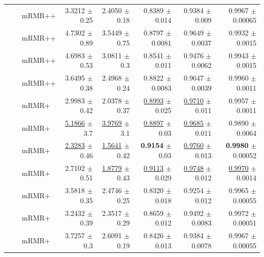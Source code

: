 \begin{longtable}{llp{}rrrrr}
 &  & mRMR++ & 3.3212 {\scriptsize $\pm$ 0.25} & 2.4050 {\scriptsize $\pm$ 0.18} & 0.8389 {\scriptsize $\pm$ 0.014} & 0.9384 {\scriptsize $\pm$ 0.009} & 0.9967 {\scriptsize $\pm$ 0.00065} \\
 &  & mRMR++ & 4.7302 {\scriptsize $\pm$ 0.89} & 3.5449 {\scriptsize $\pm$ 0.75} & 0.8797 {\scriptsize $\pm$ 0.0081} & 0.9649 {\scriptsize $\pm$ 0.0037} & 0.9932 {\scriptsize $\pm$ 0.0015} \\
 &  & mRMR++ & 4.6983 {\scriptsize $\pm$ 0.53} & 3.0811 {\scriptsize $\pm$ 0.3} & 0.8541 {\scriptsize $\pm$ 0.011} & 0.9476 {\scriptsize $\pm$ 0.0062} & 0.9943 {\scriptsize $\pm$ 0.0015} \\
 &  & mRMR++ & 3.6495 {\scriptsize $\pm$ 0.38} & 2.4968 {\scriptsize $\pm$ 0.24} & 0.8822 {\scriptsize $\pm$ 0.0083} & 0.9647 {\scriptsize $\pm$ 0.0039} & 0.9960 {\scriptsize $\pm$ 0.0011} \\
 &  & mRMR+ & 2.9983 {\scriptsize $\pm$ 0.42} & 2.0378 {\scriptsize $\pm$ 0.37} & \underline{0.8993} {\scriptsize $\pm$ 0.025} & \underline{0.9710} {\scriptsize $\pm$ 0.011} & 0.9957 {\scriptsize $\pm$ 0.0011} \\
 &  & mRMR+ & \underline{5.1866} {\scriptsize $\pm$ 3.7} & \underline{3.9769} {\scriptsize $\pm$ 3.1} & \underline{0.8897} {\scriptsize $\pm$ 0.03} & \underline{0.9685} {\scriptsize $\pm$ 0.011} & 0.9890 {\scriptsize $\pm$ 0.0064} \\
 &  & mRMR+ & \underline{2.3283} {\scriptsize $\pm$ 0.46} & \underline{1.5641} {\scriptsize $\pm$ 0.42} & \textbf{0.9154} {\scriptsize $\pm$ 0.03} & \underline{0.9760} {\scriptsize $\pm$ 0.013} & \textbf{0.9980} {\scriptsize $\pm$ 0.00052} \\
 &  & mRMR+ & 2.7102 {\scriptsize $\pm$ 0.51} & \underline{1.8779} {\scriptsize $\pm$ 0.43} & \underline{0.9113} {\scriptsize $\pm$ 0.029} & \underline{0.9748} {\scriptsize $\pm$ 0.012} & \underline{0.9970} {\scriptsize $\pm$ 0.0014} \\
 &  & mRMR+ & 3.5818 {\scriptsize $\pm$ 0.35} & 2.4746 {\scriptsize $\pm$ 0.25} & 0.8320 {\scriptsize $\pm$ 0.018} & 0.9254 {\scriptsize $\pm$ 0.012} & 0.9965 {\scriptsize $\pm$ 0.00055} \\
 &  & mRMR+ & 3.2432 {\scriptsize $\pm$ 0.39} & 2.3517 {\scriptsize $\pm$ 0.29} & 0.8659 {\scriptsize $\pm$ 0.012} & 0.9492 {\scriptsize $\pm$ 0.0083} & 0.9972 {\scriptsize $\pm$ 0.00051} \\
 &  & mRMR+ & 3.7257 {\scriptsize $\pm$ 0.3} & 2.6091 {\scriptsize $\pm$ 0.19} & 0.8426 {\scriptsize $\pm$ 0.013} & 0.9384 {\scriptsize $\pm$ 0.0078} & 0.9967 {\scriptsize $\pm$ 0.00055} \\

\end{longtable}

